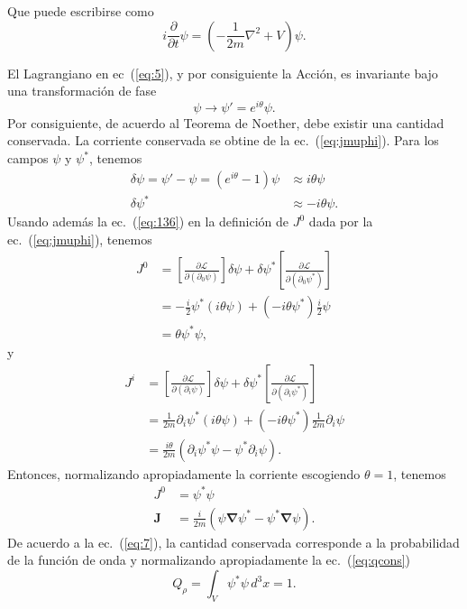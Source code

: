 Que puede escribirse como
\begin{equation}
  \label{eq:133}
  i\frac{\partial}{\partial t}\psi=
  \left(
    -\frac{1}{2m}\nabla^2+V
  \right)\psi.
\end{equation}

El Lagrangiano en ec~(\ref{eq:5}), y por consiguiente la Acci\'on, es invariante bajo una transformaci\'on de fase
\begin{equation}
  \label{eq:6}
  \psi\to\psi'=e^{i\theta}\psi.
\end{equation}
Por consiguiente, de acuerdo al Teorema de Noether, debe existir una cantidad conservada. La corriente conservada se obtine de la ec.~(\ref{eq:jmuphi}). Para los campos $\psi$ y $\psi^*$, tenemos
\begin{align}
  \delta\psi=\psi'-\psi=(e^{i\theta}-1)\psi&\approx i\theta\psi\\
  \delta\psi^*&\approx-i\theta\psi.
\end{align}
Usando adem\'as la ec.~(\ref{eq:136}) en la definici\'on de $J^0$ dada por la ec.~(\ref{eq:jmuphi}), tenemos
\begin{align}
  \label{eq:135}
  J^0&=\left[\frac{\partial\mathcal{L}}{\partial(\partial_0\psi)}\right]\delta\psi
  +\delta\psi^*\left[\frac{\partial\mathcal{L}}{\partial(\partial_0\psi^*)}\right]\nonumber\\
  &=-\frac{i}{2}\psi^*(i\theta\psi)+(-i\theta\psi^*)\frac{i}{2}\psi\nonumber\\
  &=\theta\psi^*\psi,
\end{align}
y
\begin{align}
  \label{eq:134}
  J^i&=\left[\frac{\partial\mathcal{L}}{\partial(\partial_i\psi)}\right]\delta\psi
  +\delta\psi^*\left[\frac{\partial\mathcal{L}}{\partial(\partial_i\psi^*)}\right]\nonumber\\
  &=\frac{1}{2m}\partial_i\psi^*(i\theta\psi)+(-i\theta\psi^*)\frac{1}{2m}\partial_i\psi\nonumber\\
  &=\frac{i\theta}{2m}\left(\partial_i\psi^*\psi-\psi^*\partial_i\psi \right).
\end{align}
Entonces, normalizando apropiadamente la corriente escogiendo $\theta=1$, tenemos
\begin{align}
  \label{eq:7}
  J^0&=\psi^*\psi\\
  \mathbf{J}&=\frac{i}{2m}
  \left(
    \psi\boldsymbol{\nabla}\psi^*-\psi^*\boldsymbol{\nabla}\psi
  \right).
\end{align}
De acuerdo a la ec.~(\ref{eq:7}), la cantidad conservada corresponde a la probabilidad de la funci\'on de onda y normalizando apropiadamente la ec.~(\ref{eq:qcons})
\begin{equation}
  \label{eq:57}
Q_\rho=  \int_V \psi^*\psi \,d^3x=1.
\end{equation}


